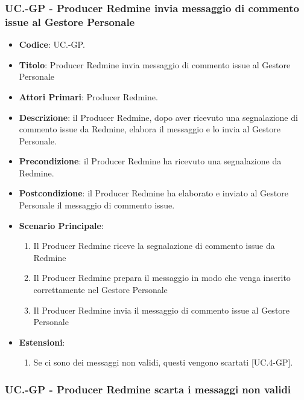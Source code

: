 	\subsubsection{UC\theuccount.\thesubuccount-GP - Producer Redmine invia messaggio di commento issue al Gestore Personale}
	\begin{itemize}
		\item \textbf{Codice}: UC\theuccount.\thesubuccount-GP.
		\item \textbf{Titolo}: Producer Redmine invia messaggio di commento issue al Gestore Personale
		\item \textbf{Attori Primari}: Producer Redmine.
		\item \textbf{Descrizione}: il Producer Redmine, dopo aver ricevuto una segnalazione di commento issue da Redmine, elabora il messaggio e lo invia al Gestore Personale.
		\item \textbf{Precondizione}: il Producer Redmine ha ricevuto una segnalazione da Redmine.
		\item \textbf{Postcondizione}: il Producer Redmine ha elaborato e inviato al Gestore Personale il messaggio di commento issue.
		\item \textbf{Scenario Principale}:
		\begin{enumerate}
			\item Il Producer Redmine riceve la segnalazione di commento issue da Redmine
			\item Il Producer Redmine prepara il messaggio in modo che venga inserito correttamente nel Gestore Personale
			\item Il Producer Redmine invia il messaggio di	commento issue al Gestore Personale
		\end{enumerate}
		\item \textbf{Estensioni}:
		\begin{enumerate}
			\item Se ci sono dei messaggi non validi, questi vengono scartati [UC\theuccount.4-GP].
		\end{enumerate}
	\end{itemize}

	\subsubsection{UC\theuccount.\thesubuccount-GP - Producer Redmine scarta i messaggi non validi}

